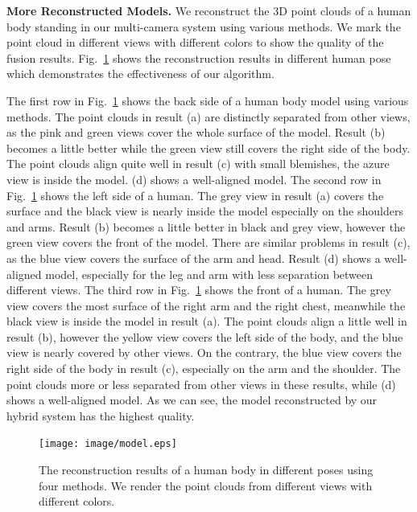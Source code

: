 \noindent \textbf{More Reconstructed Models.}
%
We reconstruct the 3D point clouds of a human body standing in our multi-camera system using various methods.  We mark the point cloud in different views with different colors to show the quality of the fusion results. Fig.~\ref{fig:model_poses} shows the reconstruction results in different human pose which demonstrates the effectiveness of our algorithm.

The first row in Fig.~\ref{fig:model_poses} shows the back side of a human body model using various methods. The point clouds in result (a) are distinctly separated from other views, as the pink and green views cover the whole surface of the model. Result (b) becomes a little better while the green view still covers the right side of the body. The point clouds align quite well in result (c) with small blemishes, the azure view is inside the model. (d) shows a well-aligned model.
The second row in Fig.~\ref{fig:model_poses} shows the left side of a human. The grey view in result (a) covers the surface and the black view is nearly inside the model especially on the shoulders and arms. Result (b) becomes a little better in black and grey view, however the green view covers the front of the model. There are similar problems in result (c), as the blue view covers the surface of the arm and head. Result (d) shows a well-aligned model, especially for the leg and arm with less separation between different views.
The third row in Fig.~\ref{fig:model_poses} shows the front of a human. The grey view covers the most surface of the right arm and the right chest, meanwhile the black view is inside the model in result (a). The point clouds align a little well in result (b), however the yellow view covers the left side of the body, and the blue view is nearly covered by other views. On the contrary, the blue view covers the right side of the body in result (c), especially on the arm and the shoulder. The point clouds more or less separated from other views in these results, while (d) shows a well-aligned model.
As we can see, the model reconstructed by our hybrid system has the highest quality.
\begin{figure}[ht]
	\centering
	\texttt{[image: image/model.eps]}
	\caption{The reconstruction results of a human body in different poses using four methods. We render the point clouds from different views with different colors.}
	\label{fig:model_poses}
\end{figure}


\comments{}


